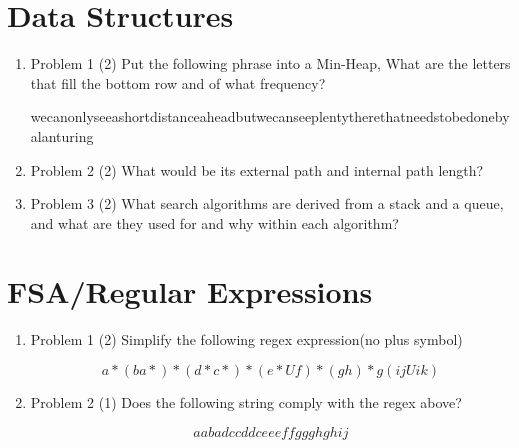 \documentclass{article}
\begin{document}
\section{Data Structures}
\begin{enumerate}
    \item{Problem 1 (2)} Put the following phrase into a Min-Heap, What are the letters that fill the bottom row and of what frequency?
    
    wecanonlyseeashortdistanceaheadbutwecanseeplentytherethatneedstobedonebyalanturing
    
    \bigskip
    \item{Problem 2 (2)} What would be its external path and internal path length?
    \bigskip
    \item{Problem 3 (2)} What search algorithms are derived from a stack and a queue, and what are they used for and why within each algorithm?
    \bigskip
    
    
\end{enumerate}


\section{FSA/Regular Expressions}
\begin{enumerate}
    \item{Problem 1 (2) Simplify the following regex expression(no plus symbol)}
    
    $$a*(ba*)* (d*c*)* (e* U f)*(gh)*g(ij U ik)$$
    
    \item{Problem 2 (1) Does the following string comply with the regex above?}
    
    $$aabadccddceeeffggghghij$$

\end{enumerate}
\end{document}
